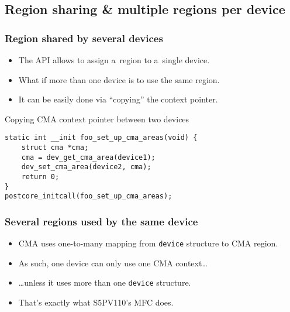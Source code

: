 \subsection{Region sharing \& multiple regions per device}

\begin{frame}[fragile]
  \frametitle{Region shared by several devices}

  \begin{itemize}
  \item The API allows to assign a~region to a~single device.
  \item What if more than one device is to use the same region.
  \item It can be easily done via “copying” the context pointer.
  \end{itemize}

  \begin{block}{Copying CMA context pointer between two devices}
\begin{lstlisting}
static int __init foo_set_up_cma_areas(void) {
    struct cma *cma;
    cma = dev_get_cma_area(device1);
    dev_set_cma_area(device2, cma);
    return 0;
}
postcore_initcall(foo_set_up_cma_areas);
\end{lstlisting}
  \end{block}
\end{frame}

\begin{frame}
  \frametitle{Several regions used by the same device}

  \begin{itemize}
  \item CMA uses one-to-many mapping from \lstinline|device| structure
    to CMA region.
  \item As such, one device can only use one CMA context\ldots
  \item \ldots unless it uses more than one \lstinline|device|
    structure.
  \item That's exactly what S5PV110's MFC does.
  \end{itemize}
\end{frame}
